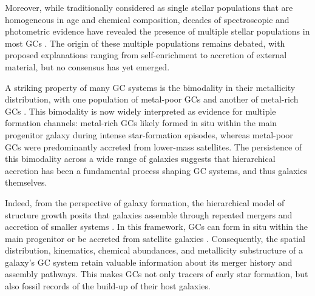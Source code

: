     Moreover, while traditionally considered as single stellar populations that are homogeneous in age and chemical composition, decades of spectroscopic and photometric evidence have revealed the presence of multiple stellar populations in most GCs \citep{2008MNRAS.391..825D,2011ApJ...726...36C,2012A&ARv..20...50G,2018ARA&A..56...83B}. The origin of these multiple populations remains debated, with proposed explanations ranging from self-enrichment to accretion of external material, but no consensus has yet emerged.

    
    

    A striking property of many GC systems is the bimodality in their metallicity distribution, with one population of metal-poor GCs and another of metal-rich GCs \citep[e.g.,][]{2006ARA&A..44..193B, 2015ApJ...806...36H}. This bimodality is now widely interpreted as evidence for multiple formation channels: metal-rich GCs likely formed in situ within the main progenitor galaxy during intense star-formation episodes, whereas metal-poor GCs were predominantly accreted from lower-mass satellites. The persistence of this bimodality across a wide range of galaxies suggests that hierarchical accretion has been a fundamental process shaping GC systems, and thus galaxies themselves.

    Indeed, from the perspective of galaxy formation, the hierarchical model of structure growth posits that galaxies assemble through repeated mergers and accretion of smaller systems \citep{2015ARA&A..53...51S}. In this framework, GCs can form in situ within the main progenitor or be accreted from satellite galaxies \citep[e.g.,][]{2018MNRAS.479.4760F,2020MNRAS.498.2472K,2021ApJ...920...51M,2022ApJ...930L...9M,2023A&A...673A..86P,2024MNRAS.528.3198B,2025A&A...693A.155P}. Consequently, the spatial distribution, kinematics, chemical abundances, and metallicity substructure of a galaxy's GC system retain valuable information about its merger history and assembly pathways. This makes GCs not only tracers of early star formation, but also fossil records of the build-up of their host galaxies.


